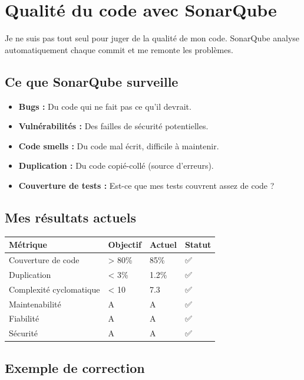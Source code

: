 \section{Qualité du code avec SonarQube}

Je ne suis pas tout seul pour juger de la qualité de mon code. SonarQube analyse automatiquement chaque commit et me remonte les problèmes.

\subsection{Ce que SonarQube surveille}

\begin{itemize}
    \item \textbf{Bugs :} Du code qui ne fait pas ce qu'il devrait.
    \item \textbf{Vulnérabilités :} Des failles de sécurité potentielles.
    \item \textbf{Code smells :} Du code mal écrit, difficile à maintenir.
    \item \textbf{Duplication :} Du code copié-collé (source d'erreurs).
    \item \textbf{Couverture de tests :} Est-ce que mes tests couvrent assez de code ?
\end{itemize}

\subsection{Mes résultats actuels}

\begin{center}
\begin{tabular}{|l|l|l|l|}
\hline
\textbf{Métrique} & \textbf{Objectif} & \textbf{Actuel} & \textbf{Statut} \\
\hline
Couverture de code & > 80\% & 85\% & ✅ \\
Duplication & < 3\% & 1.2\% & ✅ \\
Complexité cyclomatique & < 10 & 7.3 & ✅ \\
Maintenabilité & A & A & ✅ \\
Fiabilité & A & A & ✅ \\
Sécurité & A & A & ✅ \\
\hline
\end{tabular}
\end{center}

\subsection{Exemple de correction}

